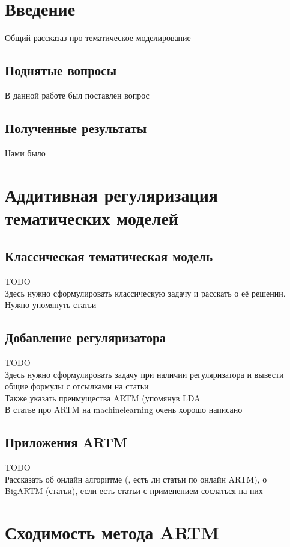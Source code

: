 \documentclass[12pt]{article}
\renewcommand{\baselinestretch}{1.4}
\begin{document}
	\tableofcontents
	\newpage
	\renewcommand{\baselinestretch}{1.5}
	\section{Введение}
	Общий рассказаз про тематическое моделирование
	\subsection{Поднятые вопросы}
	В данной работе был поставлен вопрос \\
	\subsection{Полученные результаты} 
	Нами было  \\
	\section{Аддитивная регуляризация тематических моделей}

	\subsection{Классическая тематическая модель}
	TODO\\
	Здесь нужно сформулировать классическую задачу и расскать о её решении. Нужно упомянуть статьи \cite{plsadef1, plsadef2}
	

	\subsection{Добавление регуляризатора}
	TODO\\
	Здесь нужно сформулировать задачу при наличии регуляризатора и вывести общие формулы с отсылками на статьи \cite{artmdef1, artmdef2, artmdef3}\\
	Также указать преимущества ARTM (упомянув LDA \cite{ldadef1}\\
	В статье про ARTM на machinelearning очень хорошо написано

	\subsection{Приложения ARTM}
	TODO\\
	Рассказать об онлайн алгоритме (\cite{ldaonline1}, есть ли статьи по онлайн ARTM), о BigARTM (статьи), если есть статьи с применением сослаться на них

	\section{Сходимость метода ARTM}
\end{document}
